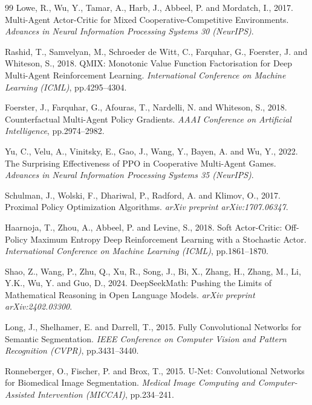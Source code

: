 \begin{thebibliography}{99}
Lowe, R., Wu, Y., Tamar, A., Harb, J., Abbeel, P. and Mordatch, I., 2017.
Multi-Agent Actor-Critic for Mixed Cooperative-Competitive Environments.
\textit{Advances in Neural Information Processing Systems 30 (NeurIPS)}.

Rashid, T., Samvelyan, M., Schroeder de Witt, C., Farquhar, G., Foerster, J. and
Whiteson, S., 2018.
QMIX: Monotonic Value Function Factorisation for Deep Multi-Agent Reinforcement
Learning.
\textit{International Conference on Machine Learning (ICML)}, pp.4295--4304.

Foerster, J., Farquhar, G., Afouras, T., Nardelli, N. and Whiteson, S., 2018.
Counterfactual Multi-Agent Policy Gradients.
\textit{AAAI Conference on Artificial Intelligence}, pp.2974--2982.

Yu, C., Velu, A., Vinitsky, E., Gao, J., Wang, Y., Bayen, A. and Wu, Y., 2022.
The Surprising Effectiveness of PPO in Cooperative Multi-Agent Games.
\textit{Advances in Neural Information Processing Systems 35 (NeurIPS)}.

Schulman, J., Wolski, F., Dhariwal, P., Radford, A. and Klimov, O., 2017.
Proximal Policy Optimization Algorithms.
\textit{arXiv preprint arXiv:1707.06347}.

Haarnoja, T., Zhou, A., Abbeel, P. and Levine, S., 2018.
Soft Actor-Critic: Off-Policy Maximum Entropy Deep Reinforcement Learning with a
Stochastic Actor.
\textit{International Conference on Machine Learning (ICML)}, pp.1861--1870.

Shao, Z., Wang, P., Zhu, Q., Xu, R., Song, J., Bi, X., Zhang, H., Zhang, M.,
Li, Y.K., Wu, Y. and Guo, D., 2024.
DeepSeekMath: Pushing the Limits of Mathematical Reasoning in Open Language Models.
\textit{arXiv preprint arXiv:2402.03300}.

Long, J., Shelhamer, E. and Darrell, T., 2015.
Fully Convolutional Networks for Semantic Segmentation.
\textit{IEEE Conference on Computer Vision and Pattern Recognition (CVPR)},
pp.3431--3440.

Ronneberger, O., Fischer, P. and Brox, T., 2015.
U-Net: Convolutional Networks for Biomedical Image Segmentation.
\textit{Medical Image Computing and Computer-Assisted Intervention (MICCAI)},
pp.234--241.


\end{thebibliography}
